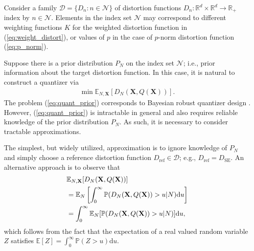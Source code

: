 \documentclass[conference]{IEEEtran}
\begin{document}
Consider a family $\mathcal{D} = \{D_n: n \in \mathcal{N}\}$ of distortion functions $D_n: \mathbb{R}^d \times \mathbb{R}^d \rightarrow \mathbb{R}_+$ index by $n \in \mathcal{N}$. Elements in the index set $\mathcal{N}$ may correspond to different weighting functions $K$ for the weighted distortion function in (\ref{eq:weight_distort}), or values of $p$ in the case of $p$-norm distortion function (\ref{eq:p_norm}). 

Suppose there is a prior distribution $P_N$ on the index set $\mathcal{N}$; i.e., prior information about the target distortion function. In this case, it is natural to construct a quantizer via
\begin{align}\label{eq:quant_prior}
	\min \mathbb{E}_{N,\mathbf{X}}[D_N(\mathbf{X},Q(\mathbf{X}))].
\end{align}
The problem (\ref{eq:quant_prior}) corresponds to Bayesian robust quantizer design \cite{Vempaty2014quantizer}. However, (\ref{eq:quant_prior}) is intractable in general and also requires reliable knowledge of the prior distribution $P_N$. As such, it is necessary to consider tractable approximations. 

The simplest, but widely utilized, approximation is to ignore knowledge of $P_N$ and simply choose a reference distortion function $D_{\mathrm{ref}} \in \mathcal{D}$; e.g., $D_{\mathrm{ref}} = D_{\mathrm{SE}}$. An alternative approach is to observe that 
\begin{align}
	&\mathbb{E}_{N,\mathbf{X}}[D_N(\mathbf{X},Q(\mathbf{X}))]\notag\\
	&= \mathbb{E}_N\left[\int_0^{\infty} \mathbb{P}(D_N(\mathbf{X},Q(\mathbf{X})) > u|N)\mathrm{d}u\right]\notag\\
	&= \int_0^{\infty} \mathbb{E}_N[\mathbb{P}(D_N(\mathbf{X},Q(\mathbf{X})) > u|N)]\mathrm{d}u,
\end{align}
which follows from the fact that the expectation of a real valued random variable $Z$ satisfies $\mathbb{E}[Z] = \int_0^{\infty} \mathbb{P}(Z > u)\mathrm{d}u$. 
\end{document}
